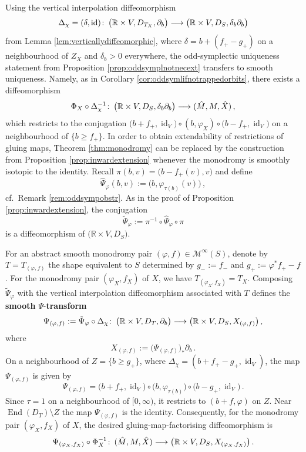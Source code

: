 \documentclass{amsart}
\theoremstyle{definition}
\def\co{\colon\thinspace}
\newcommand{\MM}{\mathcal M}
\newcommand{\R}{\mathbb R}
\newcommand{\lra}{\longrightarrow}
\DeclareMathOperator{\End}{\mathrm{End}}
\DeclareMathOperator{\id}{\mathrm{id}}
\begin{document}
Using the vertical interpolation diffeomorphism
\[
\Delta_{\chi}=(\delta,\id)
\co
\big(\R\times V,D_{T_X},\partial_b\big)
\lra
\big(\R\times V,D_S,\delta_b\partial_b\big)
\]
from Lemma \ref{lem:verticallydiffeomorphic},
where $\delta=b+(f_+-g_+)$ on a neighbourhood of $Z_X$
and $\delta_b>0$ everywhere,
the odd-symplectic uniqueness statement from
Proposition \ref{prop:oddsymplnotnecext}
transfers to smooth uniqueness.
Namely, as in Corollary \ref{cor:oddsymlifnotrappedorbits},
there exists a diffeomorphism
  \[
  \Phi_X\circ\Delta_{\chi}^{-1}\co
  \big(\R\times V,D_S,\delta_b\partial_b\big)
  \lra
  (\hat{M},M,\hat{X})
  \,,
  \]
which restricts to the conjugation
$
\big(b+f_+,\id_V\!\big)
\circ
(b,\varphi_X)
\circ
\big(b-f_+,\id_V\!\big)
$
on a neighbourhood of $\{b\geq f_+\}$.
In order to obtain extendability
of restrictions of gluing maps,
Theorem \ref{thm:monodromy} can be replaced
by the construction from
Proposition \ref{prop:inwardextension}
whenever the monodromy is smoothly isotopic to the identity.
Recall $\pi(b,v)=\big(b-f_+(v),v\big)$
and define
\[
\hat{\Psi}_{\varphi}(b,v)
:=
\big(b,\varphi_{\tau(b)}(v)\big)
\,,
\]
cf.\ Remark \ref{rem:oddsympobstr}.
As in the proof of Proposition \ref{prop:inwardextension},
the conjugation
\[
\tilde{\Psi}_{\varphi}:=
\pi^{-1}\circ\hat{\Psi}_{\varphi}\circ\pi
\]
is a diffeomorphism of
$\big(\R\times V,D_S\big)$.

For an abstract smooth monodromy pair
$(\varphi,f)\in\MM^{\infty}(S)$,
denote by $T=T_{(\varphi,f)}$
the shape equivalent to $S$ determined by
$g_-:=f_-$ and
$g_+:=\varphi^*f_+-f$.
For the monodromy pair $(\varphi_X,f_X)$ of $X$,
we have $T_{(\varphi_X,f_X)}=T_X$.
Composing $\tilde{\Psi}_{\varphi}$
with the vertical interpolation diffeomorphism
associated with $T$
defines the {\bf smooth} $\Psi$-{\bf transform}
\[
\Psi_{(\varphi,f)}
:=
\tilde{\Psi}_{\varphi}\circ\Delta_{\chi}
\co
\big(\R\times V,D_T,\partial_b\big)
\lra
\big(\R\times V,D_S,X_{(\varphi,f)}\big)
\,,
\]
where
\[
X_{(\varphi,f)}
:=
\big(\Psi_{(\varphi,f)}\big)_*\partial_b
\,.
\]
On a neighbourhood of $Z=\{b\geq g_+\}$,
where $\Delta_{\chi}=(b+f_+-g_+,\id_V)$,
the map $\Psi_{(\varphi,f)}$ is given by
\[
\Psi_{(\varphi,f)}=
\big(b+f_+,\id_V\!\big)
\circ
\big(b,\varphi_{\tau(b)}\big)
\circ
\big(b-g_+,\id_V\!\big)
\,.
\]
Since $\tau=1$ on a neighbourhood of $[0,\infty)$,
it restricts to $(b+f,\varphi)$ on $Z$.
Near $\End(D_T)\setminus Z$
the map $\Psi_{(\varphi,f)}$ is the identity.
Consequently, for the monodromy pair
$(\varphi_X,f_X)$ of $X$,
the desired gluing-map-factorising diffeomorphism is
\[
\Psi_{(\varphi_X,f_X)}\circ\Phi_X^{-1}\co
(\hat{M},M,\hat{X})
\lra
\big(
\R\times V,
D_S,
X_{(\varphi_X,f_X)}
\big)
\,.
\]
\end{document}
